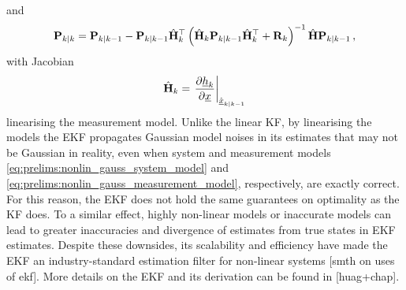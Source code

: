 and
\begin{equation}\label{eq:prelims:ekf_cov_update}
    {\ensuremath{{\mathbf{P}}}}_{k|k} = {{\mathbf{P}}}_{k|k-1}-{{\mathbf{P}}}_{k|k-1}\hat{{{\mathbf{H}}}}_k^\top\left(\hat{{{\mathbf{H}}}}_k{{\mathbf{P}}}_{k|k-1}\hat{{{\mathbf{H}}}}_k^\top + {{\mathbf{R}}}_k\right)^{-1}\hat{{{\mathbf{H}}}}{{\mathbf{P}}}_{k|k-1}\,,
\end{equation}
with Jacobian
\begin{equation}\label{eq:prelims:ekf_update_jacobian}
    \hat{{{\mathbf{H}}}}_k = \left.\frac{\partial {\underline{h}}_k}{\partial {\underline{x}}}\right|_{\hat{{\underline{x}}}_{k|k-1}}
\end{equation}
linearising the measurement model. Unlike the linear KF, by linearising the models the EKF propagates Gaussian model noises in its estimates that may not be Gaussian in reality, even when system and measurement models \eqref{eq:prelims:nonlin_gauss_system_model} and \eqref{eq:prelims:nonlin_gauss_measurement_model}, respectively, are exactly correct. For this reason, the EKF does not hold the same guarantees on optimality as the KF does. To a similar effect, highly non-linear models or inaccurate models can lead to greater inaccuracies and divergence of estimates from true states in EKF estimates. Despite these downsides, its scalability and efficiency have made the EKF an industry-standard estimation filter for non-linear systems [smth on uses of ekf]. More details on the EKF and its derivation can be found in [huag+chap].

% 
% 

